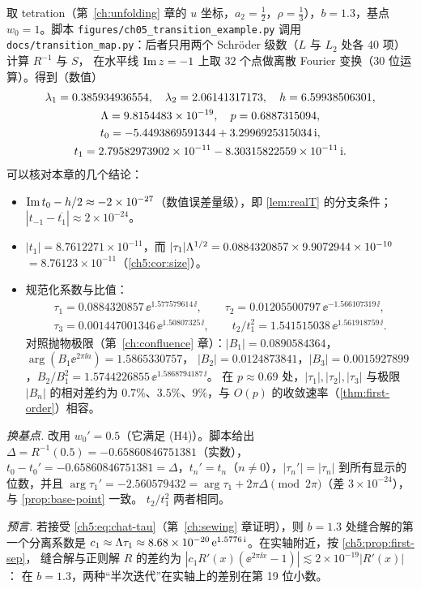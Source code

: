 \begin{example}\label{ch5:exa:b13}
取 tetration（第~\ref{ch:unfolding} 章的 $u$ 坐标，$a_2=\frac12$，$\rho=\frac13$），$b=1.3$，基点 $w_0=1$。脚本 \texttt{figures/ch05\_transition\_example.py}
调用 \texttt{docs/transition\_map.py}：后者只用两个 Schröder 级数（$L$ 与 $L_2$ 处各 40 项）计算 $R^{-1}$ 与 $S$，
在水平线 $\operatorname{Im} z=-1$ 上取 $32$ 个点做离散 Fourier 变换（30 位运算）。得到（数值）
\begin{gather*}
 \lambda_1=0.385934936554,\quad \lambda_2=2.06141317173,\quad h=6.59938506301,\\
 \Lambda=9.8154483\times10^{-19},\quad p=0.6887315094,\\
 t_0=-5.4493869591344+3.2996925315034\,\mathrm{i},\\
 t_1=2.79582973902\times10^{-11}-8.30315822559\times10^{-11}\,\mathrm{i} .
\end{gather*}
可以核对本章的几个结论：
\begin{itemize}
\item $\operatorname{Im} t_0-h/2\approx-2\times10^{-27}$（数值误差量级），即 \cref{lem:realT} 的分支条件；$|t_{-1}-\overline{t_1}|\approx2\times10^{-24}$。
\item $|t_1|=8.7612271\times10^{-11}$，而 $|\tau_1|\Lambda^{1/2}=0.0884320857\times9.9072944\times10^{-10}$
  $=8.76123\times10^{-11}$（\cref{ch5:cor:size}）。
\item 规范化系数与比值：
  \begin{gather*}
   \tau_1=0.0884320857\,\ee^{1.577579614\,\ii},\qquad
   \tau_2=0.01205500797\,\ee^{-1.566107319\,\ii},\\
   \tau_3=0.001447001346\,\ee^{1.50807325\,\ii},\qquad
   t_2/t_1^2=1.541515038\,\ee^{1.561918759\,\ii}.
  \end{gather*}
  对照抛物极限（第~\ref{ch:confluence} 章）：$|B_1|=0.0890584364$，$\arg(B_1\ee^{2\pi\ii a})=1.5865330757$，
  $|B_2|=0.0124873841$，$|B_3|=0.0015927899$，$B_2/B_1^2=1.5744226855\,\ee^{1.5868794187\,\ii}$。
  在 $p\approx0.69$ 处，$|\tau_1|,|\tau_2|,|\tau_3|$ 与极限 $|B_n|$ 的相对差约为 $0.7\%$、$3.5\%$、$9\%$，与 $O(p)$ 的收敛速率（\cref{thm:first-order}）相容。
\end{itemize}
\emph{换基点.} 改用 $w_0'=0.5$（它满足 (H4)）。脚本给出 $\Delta=R^{-1}(0.5)=-0.65860846751381$（实数），
$t_0-t_0'=-0.65860846751381=\Delta$，$t_n'=t_n$（$n\ne0$），$|\tau_n'|=|\tau_n|$ 到所有显示的位数，并且
$\arg\tau_1'=-2.560579432=\arg\tau_1+2\pi\Delta\pmod{2\pi}$（差 $3\times10^{-24}$），与 \cref{prop:base-point} 一致。
$t_2/t_1^2$ 两者相同。

\emph{预言.} 若接受 \eqref{ch5:eq:chat-tau}（第~\ref{ch:sewing} 章证明），则 $b=1.3$ 处缝合解的第一个分离系数是
$c_1\approx\Lambda\tau_1\approx8.68\times10^{-20}\,\mathrm{e}^{1.5776\,\mathrm{i}}$。在实轴附近，按 \cref{ch5:prop:first-sep}，
缝合解与正则解 $R$ 的差约为 $|c_1R'(x)(\ee^{2\pi\ii x}-1)|\lesssim2\times10^{-19}|R'(x)|$：
在 $b=1.3$，两种``半次迭代''在实轴上的差别在第 19 位小数。
\end{example}

